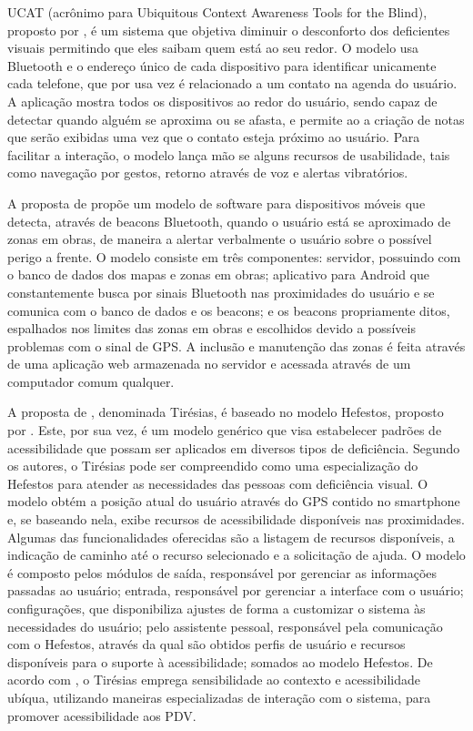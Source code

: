 \documentclass[twoside,english,brazilian]{UNISINOSartigo}
\begin{document}
UCAT (acrônimo para Ubiquitous Context Awareness Tools for the Blind), proposto por , é um sistema que objetiva diminuir o desconforto dos deficientes visuais permitindo que eles saibam quem está ao seu redor. O modelo usa Bluetooth e o endereço único de cada dispositivo para identificar unicamente cada telefone, que por usa vez é relacionado a um contato na agenda do usuário. A aplicação mostra todos os dispositivos ao redor do usuário, sendo capaz de detectar quando alguém se aproxima ou se afasta, e permite ao a criação de notas que serão exibidas uma vez que o contato esteja próximo ao usuário. Para facilitar a interação, o modelo lança mão se alguns recursos de usabilidade, tais como navegação por gestos, retorno através de voz e alertas vibratórios.

A proposta de  propõe um modelo de software para dispositivos móveis que detecta, através de beacons Bluetooth, quando o usuário está se aproximado de zonas em obras, de maneira a alertar verbalmente o usuário sobre o possível perigo a frente. O modelo consiste em três componentes: servidor, possuindo com o banco de dados dos mapas e zonas em obras; aplicativo para Android que constantemente busca por sinais Bluetooth nas proximidades do usuário e se comunica com o banco de dados e os beacons; e os beacons propriamente ditos, espalhados nos limites das zonas em obras e escolhidos devido a possíveis problemas com o sinal de GPS. A inclusão e manutenção das zonas é feita através de uma aplicação web armazenada no servidor e acessada através de um computador comum qualquer.

A proposta de , denominada Tirésias, é baseado no modelo Hefestos, proposto por . Este, por sua vez, é um modelo genérico que visa estabelecer padrões de acessibilidade que possam ser aplicados em diversos tipos de deficiência. Segundo os autores, o Tirésias pode ser compreendido como uma especialização do Hefestos para atender as necessidades das pessoas com deficiência visual. O modelo obtém a posição atual do usuário através do GPS contido no smartphone e, se baseando nela, exibe recursos de acessibilidade disponíveis nas proximidades. Algumas das funcionalidades oferecidas são a listagem de recursos disponíveis, a indicação de caminho até o recurso selecionado e a solicitação de ajuda. O modelo é composto pelos módulos de saída, responsável por gerenciar as informações passadas ao usuário; entrada, responsável por gerenciar a interface com o usuário; configurações, que disponibiliza ajustes de forma a customizar o sistema às necessidades do usuário; pelo assistente pessoal, responsável pela comunicação com o Hefestos, através da qual são obtidos perfis de usuário e recursos disponíveis para o suporte à acessibilidade; somados ao modelo Hefestos. De acordo com , o Tirésias emprega sensibilidade ao contexto e acessibilidade ubíqua, utilizando maneiras especializadas de interação com o sistema, para promover acessibilidade aos PDV.
\end{document}

